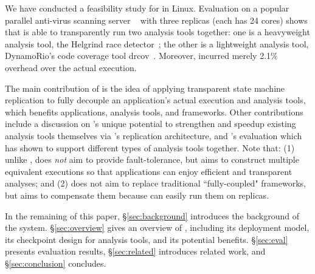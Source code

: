 We have conducted a feasibility study for \xxx in Linux. Evaluation on a 
popular parallel anti-virus scanning server \clamav~\cite{clamav} with three 
replicas (each has 24 cores) shows that \xxx is able to transparently run two 
analysis tools together: one is a heavyweight analysis tool, the Helgrind race 
detector~\cite{valgrind:pldi}; the other is a lightweight analysis tool, 
DynamoRio's code coverage tool drcov~\cite{dynamorio}. Moreover, \xxx incurred 
merely 2.1\% overhead over the actual execution.


The main contribution of \xxx is the idea of applying transparent state 
machine replication to fully decouple 
an application's actual execution and analysis tools, which benefits 
applications, analysis tools, and frameworks. Other contributions include a 
discussion on \xxx's unique potential to strengthen and speedup existing 
analysis tools themselves via \xxx's replication architecture, and \xxx's 
evaluation which has shown to support different types of analysis tools together. Note that: (1) unlike 
\repbox, \xxx does \emph{not} aim to provide fault-tolerance, but aims to 
construct multiple equivalent executions so that applications can enjoy 
efficient and transparent analyses; and (2) \xxx does not aim to replace 
traditional ``fully-coupled" frameworks, but aims to compensate them because \xxx 
can easily run them on replicas.


In the remaining of this paper, \S\ref{sec:background} introduces the 
background of the \repbox system. \S\ref{sec:overview} gives an overview of 
\xxx, including its deployment model, its checkpoint design for analysis 
tools, and its potential benefits. \S\ref{sec:eval} presents evaluation 
results, \S\ref{sec:related} introduces related work, and 
\S\ref{sec:conclusion} concludes.